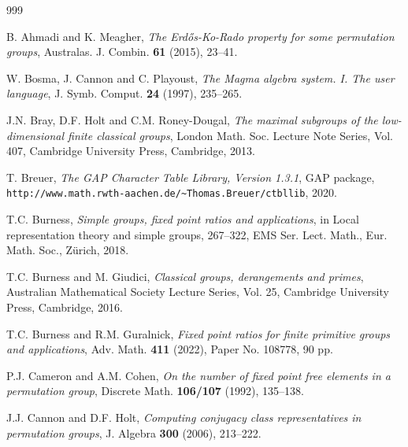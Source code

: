 \documentclass[twoside,a4paper,reqno,11pt]{amsart}
\newcommand{\<}{\langle}
\renewcommand{\>}{\rangle}
\theoremstyle{definition}
\begin{document}
	
	
	
	
	
	
	
	
	
	\begin{thebibliography}{999}
		
		B. Ahmadi and K. Meagher, \textit{The Erdős-Ko-Rado property for some permutation groups}, Australas. J. Combin. \textbf{61} (2015), 23–41.
		
		
		W. Bosma, J. Cannon and C. Playoust, \textit{The Magma algebra system. I. The user language}, J. Symb.
		Comput. \textbf{24} (1997), 235–265.
		
		J.N. Bray, D.F. Holt and C.M. Roney-Dougal, \textit{The maximal subgroups of the low-dimensional finite classical groups}, London Math. Soc. Lecture Note Series, Vol. 407, Cambridge University Press, Cambridge, 2013.
		
		T. Breuer, \emph{The \textsf{GAP} {C}haracter {T}able {L}ibrary, Version 1.3.1}, \textsf{GAP} package, \\ \texttt{http://www.math.rwth-aachen.de/\~{}Thomas.Breuer/ctbllib}, 2020.
		
		T.C. Burness, \textit{Simple groups, fixed point ratios and applications},  in Local representation theory and
		simple groups, 267–322, EMS Ser. Lect. Math., Eur. Math. Soc., Zürich, 2018.
		
		T.C. Burness and M. Giudici, \textit{Classical groups, derangements and primes}, Australian Mathematical
		Society Lecture Series, Vol. 25, Cambridge University Press, Cambridge, 2016.
		
		T.C. Burness and R.M. Guralnick, \textit{Fixed point ratios for finite primitive groups and applications}, Adv. Math. \textbf{411} (2022), Paper No. 108778, 90 pp.
		
		P.J. Cameron and A.M. Cohen, \textit{On the number of fixed point free elements in a permutation group}, Discrete Math. \textbf{106/107} (1992), 135–138.
		
		J.J. Cannon and D.F. Holt, \textit{Computing conjugacy class representatives in permutation groups}, J. Algebra \textbf{300} (2006), 213–222.
		

\end{thebibliography}
\end{document}

